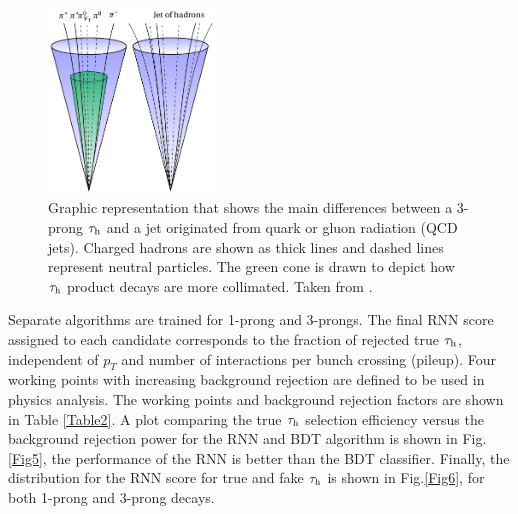 \begin{figure}[htbp]
	\centering
	\includegraphics[width=0.4\textwidth]{figures/Fig4}
	\caption{Graphic representation that shows the main differences between a 3-prong $\tau_\text{h}$ and a jet originated from quark or gluon radiation (QCD jets). Charged hadrons are shown as thick lines and dashed lines represent neutral particles. The green cone is drawn to depict how $\tau_\text{h}$ product decays are more collimated. Taken from \cite{SamImage}.}
	\label{Fig4}
\end{figure}
Separate algorithms are trained for 1-prong and 3-prongs. The final RNN score assigned to each candidate corresponds to the fraction of rejected true $\tau_\text{h}$, independent of $p_T$ and number of interactions per bunch crossing (pileup). Four working points with increasing background rejection are defined to be used in physics analysis. The working points and background rejection factors are shown in Table \ref{Table2}. A plot comparing the true $\tau_\text{h}$ selection efficiency versus the background rejection power for the RNN and BDT algorithm is shown in Fig.\ref{Fig5}, the performance of the RNN is better than the BDT classifier. Finally, the distribution for the RNN score for true and fake $\tau_\text{h}$ is shown in Fig.\ref{Fig6}, for both 1-prong and 3-prong decays.
